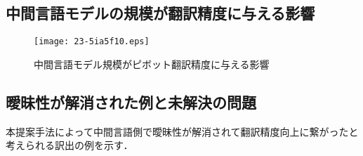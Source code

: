 \documentclass[japanese]{jnlp_1.4}
\newcommand{\asis}[1]{}
\begin{document}
\subsection{中間言語モデルの規模が翻訳精度に与える影響}

\begin{figure}[b]
\begin{center}
\texttt{[image: 23-5ia5f10.eps]}
\end{center}
\caption{中間言語モデル規模がピボット翻訳精度に与える影響}
\label{fig:pivot-lm}
\end{figure}

\asis{
中間言語モデルの規模がピボット翻訳精度に与える影響の大きさは言語対によって異なってはいるが，中間言語モデルの学習データサイズが大きくなるほど精度が向上することも確認できる．
図\ref{fig:pivot-lm}は，中国語・スペイン語（左）およびアラビア語・ロシア語（右）のピボット翻訳において異なるデータサイズで学習した中間言語モデルが翻訳精度に与える影響を示す．
図からも中間言語モデルが曖昧性を解消して翻訳精度向上に寄与している様子が確認できる．
中間言語モデルの学習データサイズを増加させることによる翻訳精度への影響は対数的であることも見てとられるが，これは目的言語モデルサイズが翻訳精度へ与える影響と同様の傾向である\cite{brants07}．
中国語・スペイン語の翻訳ではグラフの傾向から，さらに大規模な中間言語モデルを用いることで精度向上の見込みがあるが，一方でアラビア語・ロシア語の場合には学習データサイズが200万文から500万文に増加しても精度にほとんど影響が見られないため，これ以上の精度向上には限界があると考えられる．
}


\subsection{曖昧性が解消された例と未解決の問題}

本提案手法によって中間言語側で曖昧性が解消されて翻訳精度向上に繋がったと考えられる訳出の例を示す．
\end{document}
